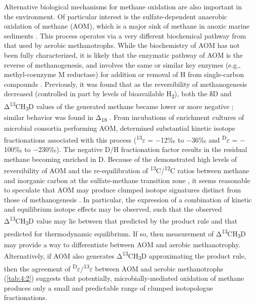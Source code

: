 Alternative biological mechanisms for methane oxidation are also
important in the environment. Of particular interest is the
sulfate-dependent anaerobic oxidation of methane (AOM), which is a major
sink of methane in anoxic marine sediments \parencite{Reeburgh_1976_EPSL}. This
process operates via a very different biochemical pathway from that used
by aerobic methanotrophs. While the biochemistry of AOM has not been
fully characterized, it is likely that the enzymatic pathway of AOM is
the reverse of methanogenesis, and involves the same or similar key
enzymes (e.g., methyl-coenzyme M reductase) for addition or removal of H
from single-carbon compounds \parencite{Scheller++_2010_N}. Previously, it was
found that as the reversibility of methanogenesis decreased (controlled
in part by levels of bioavailable H\textsubscript{2}), both the δD and
Δ\textsuperscript{13}CH\textsubscript{3}D values of the generated
methane became lower or more negative \parencite{Wang++_2015_S}; similar
behavior was found in Δ\textsubscript{18} \parencite{Stolper++_2014_S,Stolper++_2015_GCA}. From incubations of enrichment cultures of
microbial consortia performing AOM, \textcite{Holler++_2009_EMR} determined
substantial kinetic isotope fractionations associated with this process
(\textsuperscript{13}$\varepsilon$ = $-$12‰ to $-$36‰ and \textsuperscript{D}$\varepsilon$ = $-$100‰
to $-$230‰). The negative D/H fractionation factor results in the residual
methane becoming enriched in D. Because of the demonstrated high levels
of reversibility of AOM \parencite{Holler++_2011_PNAS} and the re-equilibration
of \textsuperscript{13}C/\textsuperscript{12}C ratios between methane
and inorganic carbon at the sulfate-methane transition zone \parencite{Yoshinaga++_2014_NG}, it seems reasonable to speculate that AOM may produce
clumped isotope signatures distinct from those of methanogenesis
\parencite{Stolper++_2015_GCA}. In particular, the expression of a combination
of kinetic and equilibrium isotope effects may be observed, such that
the observed Δ\textsuperscript{13}CH\textsubscript{3}D value may lie
between that predicted by the product rule and that predicted for
thermodynamic equilibrium. If so, then measurement of
Δ\textsuperscript{13}CH\textsubscript{3}D may provide a way to
differentiate between AOM and aerobic methanotrophy. Alternatively, if
AOM also generates Δ\textsuperscript{13}CH\textsubscript{3}D
approximating the product rule, then the agreement of
\textsuperscript{D}$\varepsilon$/\textsuperscript{13}$\varepsilon$ between AOM \parencite{Holler++_2009_EMR} and aerobic methanotrophs (\autoref{tab:4:2}) suggests that potentially,
microbially-mediated oxidation of methane produces only a small and
predictable range of clumped isotopologue fractionations.

